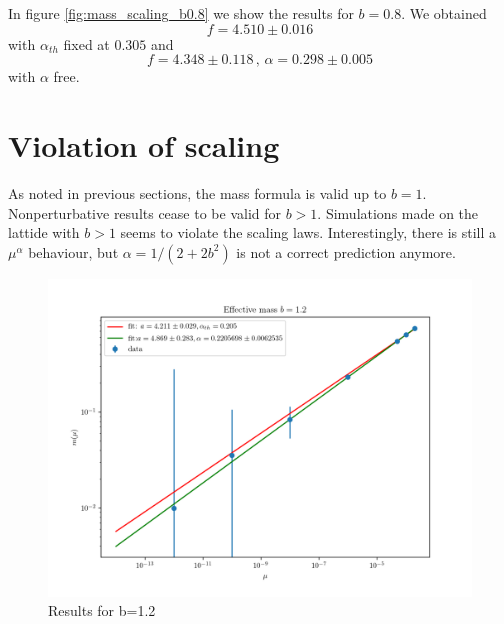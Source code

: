\documentclass[12pt,a4paper]{report}
\begin{document}
In figure \ref{fig:mass_scaling_b0.8} we show the results for $b=0.8$. We obtained \begin{equation}
f = 4.510 \pm 0.016
\end{equation} with $\alpha_{th}$ fixed at $0.305$ and \begin{equation}
f= 4.348 \pm 0.118 \,,\, \alpha = 0.298 \pm 0.005
\end{equation} with $\alpha$ free.

 

 
 \section{Violation of scaling}
 
As noted in previous sections, the mass formula is valid up to $b=1$. Nonperturbative results  cease to be valid for $b>1$. Simulations made on the lattide with $b>1$ seems to violate the scaling laws. Interestingly, there is still a $\mu^\alpha$ behaviour, but $\alpha= 1/(2+2b^2)$ is not a correct prediction anymore.


\begin{figure}
\centering
\includegraphics[width=1.0\textwidth]{b1_2}
\caption{Results for b=1.2}
\label{fig:mass_scaling_b1.2}
\end{figure}
 
\end{document}
